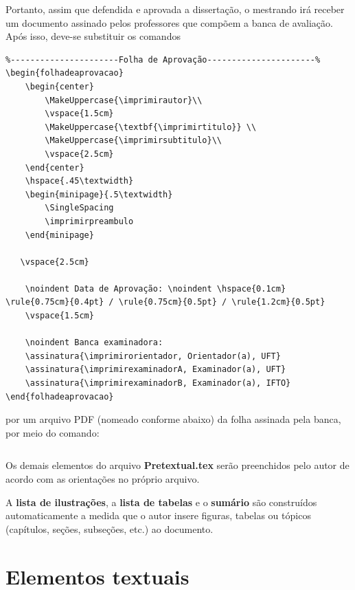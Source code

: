 Portanto, assim que defendida e aprovada a dissertação, o mestrando irá receber um documento assinado pelos professores que compõem a banca de avaliação. Após isso, deve-se substituir os comandos 
\begin{verbatim}
%----------------------Folha de Aprovação----------------------%
\begin{folhadeaprovacao}
    \begin{center}
        \MakeUppercase{\imprimirautor}\\
        \vspace{1.5cm}
        \MakeUppercase{\textbf{\imprimirtitulo}} \\
        \MakeUppercase{\imprimirsubtitulo}\\
        \vspace{2.5cm}
    \end{center}
    \hspace{.45\textwidth}
    \begin{minipage}{.5\textwidth}
        \SingleSpacing
        \imprimirpreambulo
    \end{minipage}
   
   \vspace{2.5cm}
   
    \noindent Data de Aprovação: \noindent \hspace{0.1cm} \rule{0.75cm}{0.4pt} / \rule{0.75cm}{0.5pt} / \rule{1.2cm}{0.5pt}
    \vspace{1.5cm}
    
    \noindent Banca examinadora:
    \assinatura{\imprimirorientador, Orientador(a), UFT} 
    \assinatura{\imprimirexaminadorA, Examinador(a), UFT}
    \assinatura{\imprimirexaminadorB, Examinador(a), IFTO}
\end{folhadeaprovacao}
\end{verbatim}
por um arquivo PDF (nomeado conforme abaixo) da folha assinada pela banca, por meio do comando:
\begin{verbatim}

\end{verbatim}

Os demais elementos do arquivo \textbf{Pretextual.tex} serão preenchidos pelo autor de acordo com as orientações no próprio arquivo. 

A \textbf{lista de ilustrações}, a \textbf{lista de tabelas} e o \textbf{sumário} são construídos automaticamente a medida que o autor insere figuras, tabelas ou tópicos (capítulos, seções, subseções, etc.) ao documento.

\section{Elementos textuais}

